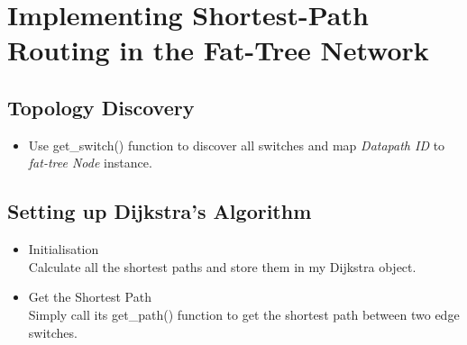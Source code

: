 \documentclass[a4paper,11pt]{article}
\begin{document}
\section{Implementing Shortest-Path Routing in the Fat-Tree Network}
\subsection{Topology Discovery}
\begin{itemize}
    \item Use get\_switch() function to discover all switches and map \textit{Datapath ID} to \textit{fat-tree Node} instance.
\end{itemize}
\subsection{Setting up Dijkstra's Algorithm}
\begin{itemize}
    \item Initialisation \\
    Calculate all the shortest paths and store them in my Dijkstra object.
    \item Get the Shortest Path \\
    Simply call its get\_path() function to get the shortest path between two edge switches.
\end{itemize}
\end{document}
